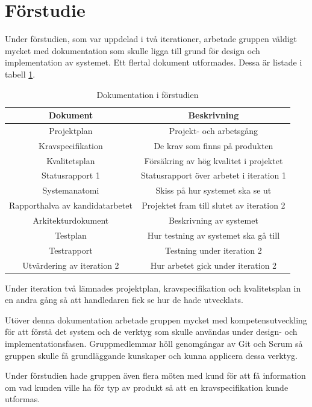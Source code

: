 \section{Förstudie}
\label{sec:forstudie}
Under förstudien, som var uppdelad i två iterationer, arbetade gruppen väldigt mycket med dokumentation som skulle ligga till grund för design och implementation av systemet. Ett flertal dokument utformades. Dessa är listade i tabell \ref{tab:docs}.

\begin{table}
\centering
\caption{Dokumentation i förstudien}
\begin{tabular}{|c|c|}
\hline
\textbf{Dokument} & \textbf{Beskrivning} \\
\hline
Projektplan & Projekt- och arbetsgång \\
\hline
Kravspecifikation & De krav som finns på produkten \\
\hline
Kvalitetsplan & Försäkring av hög kvalitet i projektet \\
\hline
Statusrapport 1 & Statusrapport över arbetet i iteration 1 \\
\hline
Systemanatomi & Skiss på hur systemet ska se ut \\
\hline
Rapporthalva av kandidatarbetet & Projektet fram till slutet av iteration 2 \\
\hline
Arkitekturdokument & Beskrivning av systemet \\
\hline
Testplan & Hur testning av systemet ska gå till \\
\hline
Testrapport & Testning under iteration 2 \\
\hline
Utvärdering av iteration 2 & Hur arbetet gick under iteration 2 \\
\hline
\end{tabular}
\label{tab:docs}
\end{table}

Under iteration två lämnades projektplan, kravspecifikation och kvalitetsplan in en andra gång så att handledaren fick se hur de hade utvecklats.

Utöver denna dokumentation arbetade gruppen mycket med kompetensutveckling för att förstå det system och de verktyg som skulle användas under design- och implementationsfasen. Gruppmedlemmar höll genomgångar av Git och Scrum så gruppen skulle få grundläggande kunskaper och kunna applicera dessa verktyg.

Under förstudien hade gruppen även flera möten med kund för att få information om vad kunden ville ha för typ av produkt så att en kravspecifikation kunde utformas.

